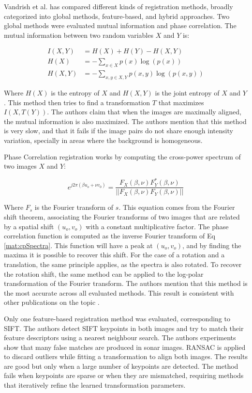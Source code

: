 Vandrish et al. \cite[-2em]{vandrish2011side} has compared different kinds of registration methods, broadly categorized into global methods, feature-based, and hybrid approaches. Two global methods were evaluated mutual information and phase correlation. The mutual information between two random variables $X$ and $Y$ is:

\begin{align}
	I(X, Y) &= H(X) + H(Y) - H(X, Y)\\		
	H(X) 	&= -\sum_{x \in X} p(x) \log(p(x))\\
	H(X, Y) &= -\sum_{x, y \in X, Y} p(x, y) \log(p(x, y))
\end{align}

Where $H(X)$ is the entropy of $X$ and $H(X, Y)$ is the joint entropy of $X$ and $Y$. This method then tries to find a transformation $T$ that maximizes $I(X, T(Y))$. The authors claim that when the images are maximally aligned, the mutual information is also maximized. The authors mention that this method is very slow, and that it fails if the image pairs do not share enough intensity variation, specially in areas where the background is homogeneous.

Phase Correlation registration works by computing the cross-power spectrum of two images $X$ and $Y$:

\begin{equation}
	e^{j2\pi(\beta u_o + \nu v_0)} = \frac{F_X(\beta, \nu)F^{*}_Y(\beta,\nu)}{||F_X(\beta, \nu)F_Y(\beta,\nu)||}
	\label{mat:cpSpectra}
\end{equation}

Where $F_s$ is the Fourier transform of $s$. This equation comes from the Fourier shift theorem, associating the Fourier transforms of two images that are related by a spatial shift $(u_o, v_o)$ with a constant multiplicative factor. The phase correlation function is computed as the inverse Fourier transform of Eq \ref{mat:cpSpectra}. This function will have a peak at $(u_o, v_o)$, and by finding the maxima it is possible to recover this shift. For the case of a rotation and a translation, the same principle applies, as the spectra is also rotated. To recover the rotation shift, the same method can be applied to the log-polar transformation of the Fourier transform. The authors mention that this method is the most accurate across all evaluated methods. This result is consistent with other publications on the topic \cite{hurtos2014real}.

Only one feature-based registration method was evaluated, corresponding to SIFT. The authors detect SIFT keypoints in both images and try to match their feature descriptors using a nearest neighbour search. The authors experiments show that many false matches are produced in sonar images. RANSAC is applied to discard outliers while fitting a transformation to align both images. The results are good but only when a large number of keypoints are detected. The method fails when keypoints are sparse or when they are mismatched, requiring methods that iteratively refine the learned transformation parameters.

